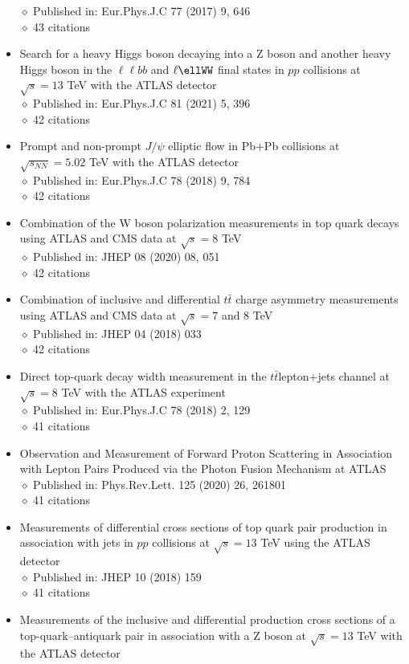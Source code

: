 \documentclass[margin, 10pt]{res} %
\begin{document}
\begin{resume}
\begin{itemize}
$\diamond$ Published in: Eur.Phys.J.C 77 (2017) 9, 646\\
$\diamond$ 43 citations
\item Search for a heavy Higgs boson decaying into a Z boson and another heavy Higgs boson in the $\ell\ell bb$ and $\ell\ellWW$ final states in $pp$ collisions at $\sqrt{s} = 13$ TeV with the ATLAS detector\\
$\diamond$ Published in: Eur.Phys.J.C 81 (2021) 5, 396\\
$\diamond$ 42 citations
\item Prompt and non-prompt $J/\psi$ elliptic flow in Pb+Pb collisions at $\sqrt{s_{NN}} = 5.02$ TeV with the ATLAS detector\\
$\diamond$ Published in: Eur.Phys.J.C 78 (2018) 9, 784\\
$\diamond$ 42 citations
\item Combination of the W boson polarization measurements in top quark decays using ATLAS and CMS data at $\sqrt{s} = 8$ TeV\\
$\diamond$ Published in: JHEP 08 (2020) 08, 051\\
$\diamond$ 42 citations
\item Combination of inclusive and differential $t\bar{t}$ charge asymmetry measurements using ATLAS and CMS data at $\sqrt{s} = 7$ and 8 TeV\\
$\diamond$ Published in: JHEP 04 (2018) 033\\
$\diamond$ 42 citations
\item Direct top-quark decay width measurement in the $t\bar{t}$lepton+jets channel at $\sqrt{s} = 8$ TeV with the ATLAS experiment\\
$\diamond$ Published in: Eur.Phys.J.C 78 (2018) 2, 129\\
$\diamond$ 41 citations
\item Observation and Measurement of Forward Proton Scattering in Association with Lepton Pairs Produced via the Photon Fusion Mechanism at ATLAS\\
$\diamond$ Published in: Phys.Rev.Lett. 125 (2020) 26, 261801\\
$\diamond$ 41 citations
\item Measurements of differential cross sections of top quark pair production in association with jets in $pp$ collisions at $\sqrt{s} = 13$ TeV using the ATLAS detector\\
$\diamond$ Published in: JHEP 10 (2018) 159\\
$\diamond$ 41 citations
\item Measurements of the inclusive and differential production cross sections of a top-quark–antiquark pair in association with a Z boson at $\sqrt{s} = 13$ TeV with the ATLAS detector\\

\end{itemize}
\end{resume}
\end{document}
